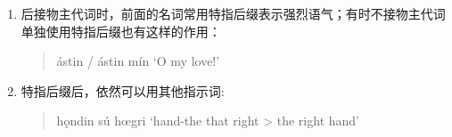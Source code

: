 \begin{enumerate}[A.]
\begin{enumerate}[1)]
        \item 后接物主代词时，前面的名词常用特指后缀表示强烈语气；有时不接物主代词单独使用特指后缀也有这样的作用：
        \begin{quote}
            ástin / ástin mín `O my love!'
          \end{quote}

        \item 特指后缀后，依然可以用其他指示词:
        \begin{quote}
            hǫndin sú hœgri `hand-the that right \textgreater{} the right hand'
          \end{quote}
          
    \end{enumerate}

\end{enumerate}
